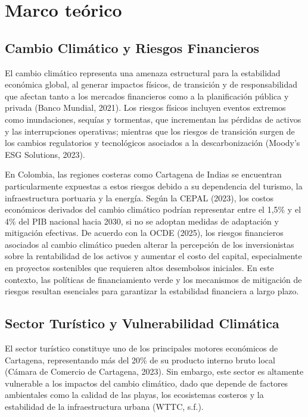 \section{Marco teórico}

\subsection{Cambio Climático y Riesgos Financieros}

El cambio climático representa una amenaza estructural para la estabilidad económica global, al generar impactos físicos, de transición y de responsabilidad que afectan tanto a los mercados financieros como a la planificación pública y privada (Banco Mundial, 2021). Los riesgos físicos incluyen eventos extremos como inundaciones, sequías y tormentas, que incrementan las pérdidas de activos y las interrupciones operativas; mientras que los riesgos de transición surgen de los cambios regulatorios y tecnológicos asociados a la descarbonización (Moody’s ESG Solutions, 2023).

En Colombia, las regiones costeras como Cartagena de Indias se encuentran particularmente expuestas a estos riesgos debido a su dependencia del turismo, la infraestructura portuaria y la energía. Según la CEPAL (2023), los costos económicos derivados del cambio climático podrían representar entre el 1,5\% y el 4\% del PIB nacional hacia 2030, si no se adoptan medidas de adaptación y mitigación efectivas. De acuerdo con la OCDE (2025), los riesgos financieros asociados al cambio climático pueden alterar la percepción de los inversionistas sobre la rentabilidad de los activos y aumentar el costo del capital, especialmente en proyectos sostenibles que requieren altos desembolsos iniciales. En este contexto, las políticas de financiamiento verde y los mecanismos de mitigación de riesgos resultan esenciales para garantizar la estabilidad financiera a largo plazo.

\subsection{Sector Turístico y Vulnerabilidad Climática}

El sector turístico constituye uno de los principales motores económicos de Cartagena, representando más del 20\% de su producto interno bruto local (Cámara de Comercio de Cartagena, 2023). Sin embargo, este sector es altamente vulnerable a los impactos del cambio climático, dado que depende de factores ambientales como la calidad de las playas, los ecosistemas costeros y la estabilidad de la infraestructura urbana (WTTC, s.f.). %

